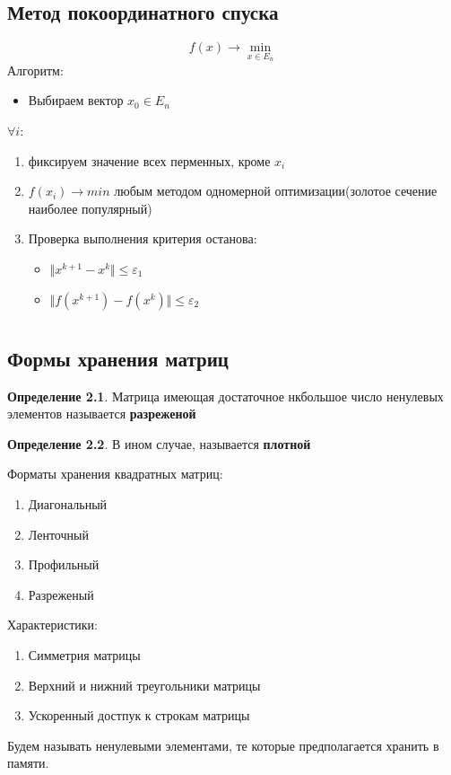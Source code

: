 \documentclass[oneside]{book}
\theoremstyle{plain}
\theoremstyle{remark}
\theoremstyle{definition}
\newtheorem*{definition}{Определение}
\begin{document}
\section{Метод покоординатного спуска}
\label{sec:orgb4807be}
\[ f(x) \to \min_{x \in E_n} \]
Алгоритм:
\begin{itemize}
\item Выбираем вектор \(x_0 \in E_n\) \\
\end{itemize}
\(\forall i:\)
\begin{enumerate}
\item фиксируем значение всех перменных, кроме \(x_i\)
\item \(f(x_i) \to min\) любым методом одномерной оптимизации(золотое сечение наиболее популярный)
\item Проверка выполнения критерия останова:
\begin{itemize}
\item \(\Vert x^{k + 1} - x^{k} \Vert \le \varepsilon_1\)
\item \(\Vert f(x^{k + 1}) - f(x^k) \Vert \le \varepsilon_2\)
\end{itemize}
\end{enumerate}
\chapter{}
\label{sec:org6ef6488}
\section{Формы хранения матриц}
\label{sec:org725888f}
\begin{definition}
Матрица имеющая достаточное нкбольшое число ненулевых элементов называется \textbf{разреженой}
\end{definition}
\begin{definition}
В ином случае, называется \textbf{плотной}
\end{definition}
Форматы хранения квадратных матриц:
\begin{enumerate}
\item Диагональный
\item Ленточный
\item Профильный
\item Разреженый
\end{enumerate}
Характеристики:
\begin{enumerate}
\item Симметрия матрицы
\item Верхний и нижний треугольники матрицы
\item Ускоренный достпук к строкам матрицы
\end{enumerate}
Будем называть ненулевыми элементами, те которые предполагается хранить в памяти.
\end{document}
